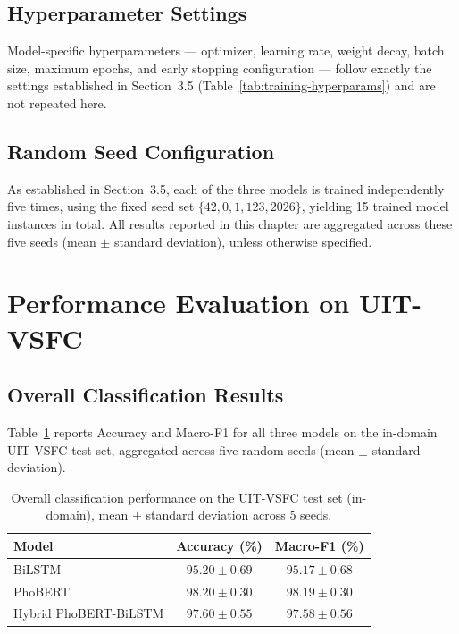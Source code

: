 \documentclass[12pt]{report} %
\begin{document}
\subsection{Hyperparameter Settings}
Model-specific hyperparameters --- optimizer, learning rate, weight decay, batch size, maximum epochs, and early stopping configuration --- follow exactly the settings established in Section~3.5 (Table~\ref{tab:training-hyperparams}) and are not repeated here.

\subsection{Random Seed Configuration}
As established in Section~3.5, each of the three models is trained independently five times, using the fixed seed set $\{42, 0, 1, 123, 2026\}$, yielding 15 trained model instances in total. All results reported in this chapter are aggregated across these five seeds (mean $\pm$ standard deviation), unless otherwise specified.

\section{Performance Evaluation on UIT-VSFC}

\subsection{Overall Classification Results}
Table~\ref{tab:uitvsfc-results} reports Accuracy and Macro-F1 for all three models on the in-domain UIT-VSFC test set, aggregated across five random seeds (mean $\pm$ standard deviation).

\begin{table}[htbp]
    \centering
    \caption{Overall classification performance on the UIT-VSFC test set (in-domain), mean $\pm$ standard deviation across 5 seeds.}
    \label{tab:uitvsfc-results}
    \begin{tabular}{lcc}
        \hline
        \textbf{Model}        & \textbf{Accuracy (\%)}    & \textbf{Macro-F1 (\%)}    \\
        \hline
        BiLSTM                & $95.20 \pm 0.69$          & $95.17 \pm 0.68$          \\
        PhoBERT               & $\mathbf{98.20 \pm 0.30}$ & $\mathbf{98.19 \pm 0.30}$ \\
        Hybrid PhoBERT-BiLSTM & $97.60 \pm 0.55$          & $97.58 \pm 0.56$          \\
        \hline
    \end{tabular}
\end{table}
\end{document}
